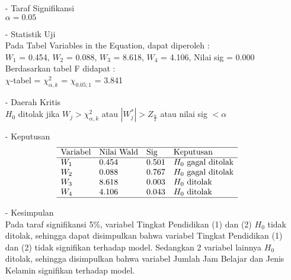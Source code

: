 \begin{enumerate}
\begin{test}
{\begin{enumerate}
        \item[-] Taraf Signifikansi \\
        $\alpha = 0.05$
    
        \item[-] Statistik Uji \\
        Pada Tabel Variables in the Equation, dapat diperoleh : \\
        $W_1$ = 0.454, $W_2$ = 0.088, $W_3$ = 8.618, $W_4$ = 4.106, Nilai sig = 0.000 \\
        Berdasarkan tabel F didapat : \\
        $\chi$-tabel = $\chi_{\alpha, k}^2$ = $\chi_{0.05; 1}$ = 3.841
    
        \item[-] Daerah Kritis \\
        $H_0$ ditolak jika $W_j > \chi_{\alpha, k}^2$ atau $|W_j^*| > Z_{\frac{\alpha}{2}}$ atau nilai sig $< \alpha$
    
        \item[-] Keputusan \\
        $$\begin{array}{lllll}
            \hline 
            \text{Variabel} & \text{Nilai Wald} & \text{Sig} & \text{Keputusan}  \\
            \hline 
            W_1 & 0.454 & 0.501 & H_0 \text{ gagal ditolak} \\
            W_2 & 0.088 & 0.767 & H_0 \text{ gagal ditolak} \\
            W_3 & 8.618 & 0.003 & H_0 \text{ ditolak} \\
            W_4 & 4.106 & 0.043 & H_0 \text{ ditolak} \\
            \hline
        \end{array}$$
    
        \item[-] Kesimpulan \\
        Pada taraf signifikansi 5\%, variabel Tingkat Pendidikan (1) dan (2) $H_0$ tidak ditolak, sehingga dapat disimpulkan bahwa variabel Tingkat Pendidikan (1) dan (2) tidak signifikan terhadap model. Sedangkan 2 variabel lainnya $H_0$ ditolak, sehingga disimpulkan bahwa variabel Jumlah Jam Belajar dan Jenis Kelamin signifikan terhadap model.
    \end{enumerate}
    }
    \end{test}
    

\end{enumerate}
